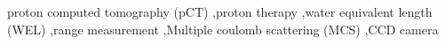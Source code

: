 \documentclass[preprint,3pt]{elsarticle} %
\begin{document}
\begin{frontmatter}
\begin{abstract}
\end{abstract}

\begin{keyword}
proton computed tomography (pCT) \sep proton therapy \sep water equivalent length (WEL) \sep range measurement \sep Multiple coulomb scattering (MCS) \sep CCD camera
\end{keyword}
\end{frontmatter}
\end{document}
